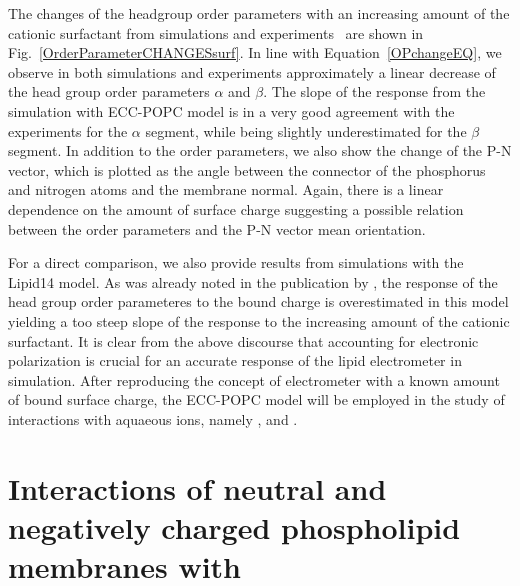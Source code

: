 The changes of the headgroup order parameters with an increasing amount of 
the cationic surfactant from simulations and experiments~\citep{scherer89} are shown in Fig.~\ref{OrderParameterCHANGESsurf}.
In line with Equation~\ref{OPchangeEQ},
we observe in both simulations and experiments approximately a linear decrease of the head group order parameters $\alpha$ and $\beta$.
The slope of the response from the simulation with ECC-POPC model 
is in a very good agreement with the experiments for the $\alpha$ segment, 
while being slightly underestimated for the $\beta$ segment.
In addition to the order parameters, we also show the change of the P-N vector, 
which is plotted as the angle between the connector of the phosphorus and nitrogen atoms and the membrane normal. 
Again, there is a linear dependence on the amount of surface charge
suggesting a possible relation between the order parameters and the P-N vector mean orientation. 

For a direct comparison, we also provide results from simulations with the Lipid14 model. 
As was already noted in the publication by \citet{catte16},
the response of the head group order parameteres to the bound charge 
is overestimated in this model yielding a too steep slope of the response to the increasing amount of the cationic surfactant. 
It is clear from the above discourse that accounting for electronic polarization is crucial for an accurate response of the lipid electrometer in simulation. 
After reproducing the concept of electrometer with a known amount of bound surface charge,
the ECC-POPC model will be employed in the study of interactions with aquaeous ions, namely ,  and . 






 
 


\section{Interactions of neutral and negatively charged phospholipid membranes with }



